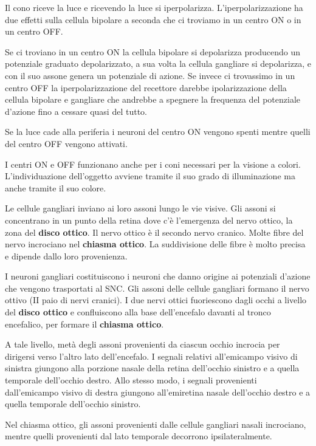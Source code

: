 \documentclass[]{article}
\begin{document}
Il cono riceve la luce e ricevendo la luce si iperpolarizza.
L'iperpolarizzazione ha due effetti sulla cellula bipolare a seconda che
ci troviamo in un centro ON o in un centro OFF.

Se ci troviano in un centro ON la cellula bipolare si depolarizza
producendo un potenziale graduato depolarizzato, a sua volta la cellula
gangliare si depolarizza, e con il suo assone genera un potenziale di
azione. Se invece ci trovassimo in un centro OFF la iperpolarizzazione
del recettore darebbe ipolarizzazione della cellula bipolare e gangliare
che andrebbe a spegnere la frequenza del potenziale d'azione fino a
cessare quasi del tutto.

Se la luce cade alla periferia i neuroni del centro ON vengono spenti
mentre quelli del centro OFF vengono attivati.

I centri ON e OFF funzionano anche per i coni necessari per la visione a
colori. L'individuazione dell'oggetto avviene tramite il suo grado di
illuminazione ma anche tramite il suo colore.

Le cellule gangliari inviano ai loro assoni lungo le vie visive. Gli
assoni si concentrano in un punto della retina dove c'è l'emergenza del
nervo ottico, la zona del \textbf{disco ottico}. Il nervo ottico è il
secondo nervo cranico. Molte fibre del nervo incrociano nel
\textbf{chiasma ottico}. La suddivisione delle fibre è molto precisa e
dipende dallo loro provenienza.

I neuroni gangliari costituiscono i neuroni che danno origine ai
potenziali d'azione che vengono trasportati al SNC. Gli assoni delle
cellule gangliari formano il nervo ottivo (II paio di nervi cranici). I
due nervi ottici fuoriescono dagli occhi a livello del \textbf{disco
ottico} e confluiscono alla base dell'encefalo davanti al tronco
encefalico, per formare il \textbf{chiasma ottico}.

A tale livello, metà degli assoni provenienti da ciascun occhio incrocia
per dirigersi verso l'altro lato dell'encefalo. I segnali relativi
all'emicampo visivo di sinistra giungono alla porzione nasale della
retina dell'occhio sinistro e a quella temporale dell'occhio destro.
Allo stesso modo, i segnali provenienti dall'emicampo visivo di destra
giungono all'emiretina nasale dell'occhio destro e a quella temporale
dell'occhio sinistro.

Nel chiasma ottico, gli assoni provenienti dalle cellule gangliari
nasali incrociano, mentre quelli provenienti dal lato temporale
decorrono ipsilateralmente.
\end{document}
